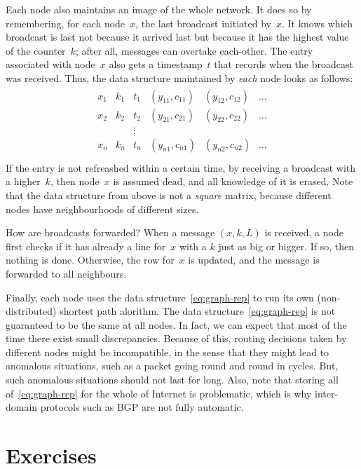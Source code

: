 Each node also maintains an image of the whole network.
It does so by remembering, for each node~$x$, the last broadcast initiated by~$x$.
It knows which broadcast is last not because it arrived last
  but because it has the highest value of the counter~$k$;
  after all, messages can overtake each-other.
The entry associated with node~$x$ also gets a timestamp~$t$
  that records when the broadcast was received.
Thus, the data structure maintained by \emph{each} node looks as follows:
\begin{align}
\begin{array}{cccccc}
  x_1 & k_1 & t_1 & (y_{11}, c_{11}) & (y_{12}, c_{12}) & \ldots \\
  x_2 & k_2 & t_2 & (y_{21}, c_{21}) & (y_{22}, c_{22}) & \ldots \\
  &&\vdots\\
  x_n & k_n & t_n & (y_{n1}, c_{n1}) & (y_{n2}, c_{n2}) & \ldots \\
\end{array}
\label{eq:graph-rep}
\end{align}
If the entry is not refreashed within a certain time,
  by receiving a broadcast with a higher~$k$,
  then node~$x$ is assumed dead, and all knowledge of it is erased.
Note that the data structure from above is not a \emph{square} matrix,
  because different nodes have neighbourhoods of different sizes.

How are broadcasts forwarded?
When a message $(x,k,L)$ is received,
  a node first checks if it has already a line for~$x$
    with a $k$ just as big or bigger.
If so, then nothing is done.
Otherwise, the row for~$x$ is updated,
  and the message is forwarded to all neighbours.

Finally, each node uses the data structure~\eqref{eq:graph-rep}
  to run its own (non-distributed) shortest path alorithm.
The data structure~\eqref{eq:graph-rep} is not guaranteed to be the same at all nodes.
In fact, we can expect that most of the time there exist small discrepancies.
Because of this,
  routing decisions taken by different nodes might be incompatible,
  in the sense that they might lead to anomalous situations,
    such as a packet going round and round in cycles.
But, such anomalous situations should not last for long.
Also,
  note that storing all of~\eqref{eq:graph-rep} for the whole of Internet
    is problematic,
  which is why inter-domain protocols such as BGP are not fully automatic.


\section{Exercises}

